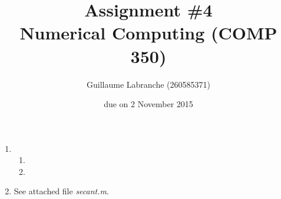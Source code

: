 \documentclass{article}
\author{Guillaume Labranche (260585371)}
\title{Assignment \#4\\Numerical Computing (COMP 350)}
\date{due on 2 November 2015}
\begin{document}
\maketitle
 
\begin{enumerate}
\item \begin{enumerate}
\item
\item
\end{enumerate}
\item See attached file \emph{secant.m}.
\end{enumerate}
\end{document}
